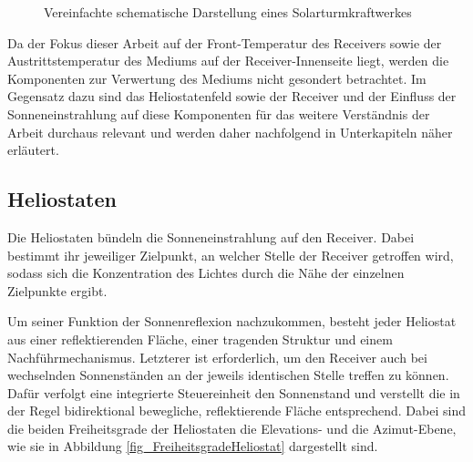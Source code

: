 \begin{figure}[h!]
    \centering
    \setlength{\fboxsep}{1pt}
    \setlength{\fboxrule}{1pt}
\caption[Vereinfachte schematische Darstellung eines Solarturmkraftwerkes]{Vereinfachte schematische Darstellung eines Solarturmkraftwerkes \cite[S.5]{DissZanger}}
    \label{fig_SchemaSolarturmkraftwerk}
\end{figure}


Da der Fokus dieser Arbeit auf der Front-Temperatur des Receivers sowie der Austrittstemperatur des Mediums auf der Receiver-Innenseite liegt, werden die Komponenten zur Verwertung des Mediums nicht gesondert betrachtet.
Im Gegensatz dazu sind das Heliostatenfeld sowie der Receiver und der Einfluss der Sonneneinstrahlung auf diese Komponenten für das weitere Verständnis der Arbeit durchaus relevant und werden daher nachfolgend in Unterkapiteln näher erläutert.


\subsection{Heliostaten} \label{subsec_Heliostaten}
Die Heliostaten bündeln die Sonneneinstrahlung auf den Receiver.
Dabei bestimmt ihr jeweiliger Zielpunkt, an welcher Stelle der Receiver getroffen wird, sodass sich die Konzentration des Lichtes durch die Nähe der einzelnen Zielpunkte ergibt.

Um seiner Funktion der Sonnenreflexion nachzukommen, besteht jeder Heliostat aus einer reflektierenden Fläche, einer tragenden Struktur und einem Nachführmechanismus.
Letzterer ist erforderlich, um den Receiver auch bei wechselnden Sonnenständen an der jeweils identischen Stelle treffen zu können.
Dafür verfolgt eine integrierte Steuereinheit den Sonnenstand und verstellt die in der Regel bidirektional bewegliche, reflektierende Fläche entsprechend.
Dabei sind die beiden Freiheitsgrade der Heliostaten die Elevations- und die Azimut-Ebene, wie sie in Abbildung \ref{fig_FreiheitsgradeHeliostat} dargestellt sind. \cite[S.13]{DissBelhomme}

